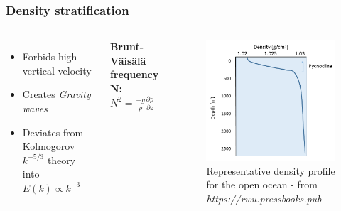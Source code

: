 \documentclass{beamer}
\newcommand{\pd}[2]{\frac{\partial #1}{\partial #2}}
\begin{document}
\begin{frame}
\frametitle{Density stratification}

\begin{columns}

\begin{itemize}
	\item Forbids high vertical velocity
	\item Creates \textit{Gravity waves}
	\item Deviates from Kolmogorov $k^{-5/3}$ theory into $E(k) \propto k^{-3}$
\end{itemize}

\quad

\textbf{Brunt-Väisälä frequency $\mathbf{N}$:} $N^2 = \frac{-g}{\rho} \pd{\rho}{z}$


\begin{figure}
	\centering
	\includegraphics[width=\textwidth]{fig/density_profile.png}
	\caption{Representative density profile for the open ocean - from \textit{https://rwu.pressbooks.pub}}
\end{figure}

\vspace{1cm}

\end{columns}
	
\end{frame}
\end{document}
